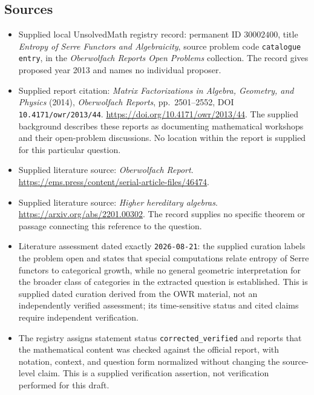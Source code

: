 \documentclass[11pt]{article}
\begin{document}
\subsection{Sources}
\begin{itemize}
\item Supplied local UnsolvedMath registry record: permanent ID \(30002400\), title \emph{Entropy of Serre Functors and Algebraicity}, source problem code \texttt{catalogue entry}, in the \emph{Oberwolfach Reports Open Problems} collection. The record gives proposed year 2013 and names no individual proposer.
\item Supplied report citation: \emph{Matrix Factorizations in Algebra, Geometry, and Physics} (2014), \emph{Oberwolfach Reports}, pp.\ 2501--2552, DOI \texttt{10.4171/owr/2013/44}. \url{https://doi.org/10.4171/owr/2013/44}. The supplied background describes these reports as documenting mathematical workshops and their open-problem discussions. No location within the report is supplied for this particular question.
\item Supplied literature source: \emph{Oberwolfach Report}. \url{https://ems.press/content/serial-article-files/46474}.
\item Supplied literature source: \emph{Higher hereditary algebras}. \url{https://arxiv.org/abs/2201.00302}. The record supplies no specific theorem or passage connecting this reference to the question.
\item Literature assessment dated exactly \texttt{2026-08-21}: the supplied curation labels the problem open and states that special computations relate entropy of Serre functors to categorical growth, while no general geometric interpretation for the broader class of categories in the extracted question is established. This is supplied dated curation derived from the OWR material, not an independently verified assessment; its time-sensitive status and cited claims require independent verification.
\item The registry assigns statement status \texttt{corrected\_verified} and reports that the mathematical content was checked against the official report, with notation, context, and question form normalized without changing the source-level claim. This is a supplied verification assertion, not verification performed for this draft.
\end{itemize}
\end{document}
